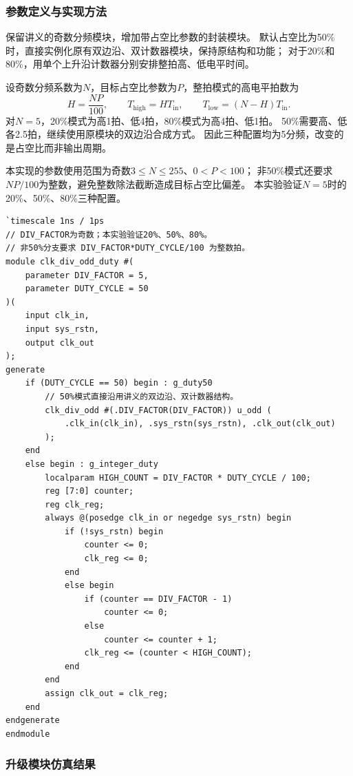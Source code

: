 \subsubsection{参数定义与实现方法}

保留讲义的奇数分频模块，增加带占空比参数的封装模块。
默认占空比为50\%时，直接实例化原有双边沿、双计数器模块，保持原结构和功能；
对于20\%和80\%，用单个上升沿计数器分别安排整拍高、低电平时间。

设奇数分频系数为$N$，目标占空比参数为$P$，整拍模式的高电平拍数为
\[
H=\frac{NP}{100},\qquad
T_{\mathrm{high}}=HT_{\mathrm{in}},\qquad
T_{\mathrm{low}}=(N-H)T_{\mathrm{in}}.
\]
对$N=5$，20\%模式为高1拍、低4拍，80\%模式为高4拍、低1拍。
50\%需要高、低各2.5拍，继续使用原模块的双边沿合成方式。
因此三种配置均为5分频，改变的是占空比而非输出周期。

本实现的参数使用范围为奇数$3\leq N\leq255$、$0<P<100$；
非50\%模式还要求$NP/100$为整数，避免整数除法截断造成目标占空比偏差。
本实验验证$N=5$时的20\%、50\%、80\%三种配置。

\begin{lstlisting}[style=vcode,caption={占空比参数化的奇数分频升级模块}]
`timescale 1ns / 1ps
// DIV_FACTOR为奇数；本实验验证20%、50%、80%。
// 非50%分支要求 DIV_FACTOR*DUTY_CYCLE/100 为整数拍。
module clk_div_odd_duty #(
    parameter DIV_FACTOR = 5,
    parameter DUTY_CYCLE = 50
)(
    input clk_in,
    input sys_rstn,
    output clk_out
);
generate
    if (DUTY_CYCLE == 50) begin : g_duty50
        // 50%模式直接沿用讲义的双边沿、双计数器结构。
        clk_div_odd #(.DIV_FACTOR(DIV_FACTOR)) u_odd (
            .clk_in(clk_in), .sys_rstn(sys_rstn), .clk_out(clk_out)
        );
    end
    else begin : g_integer_duty
        localparam HIGH_COUNT = DIV_FACTOR * DUTY_CYCLE / 100;
        reg [7:0] counter;
        reg clk_reg;
        always @(posedge clk_in or negedge sys_rstn) begin
            if (!sys_rstn) begin
                counter <= 0;
                clk_reg <= 0;
            end
            else begin
                if (counter == DIV_FACTOR - 1)
                    counter <= 0;
                else
                    counter <= counter + 1;
                clk_reg <= (counter < HIGH_COUNT);
            end
        end
        assign clk_out = clk_reg;
    end
endgenerate
endmodule
\end{lstlisting}

\subsubsection{升级模块仿真结果}

